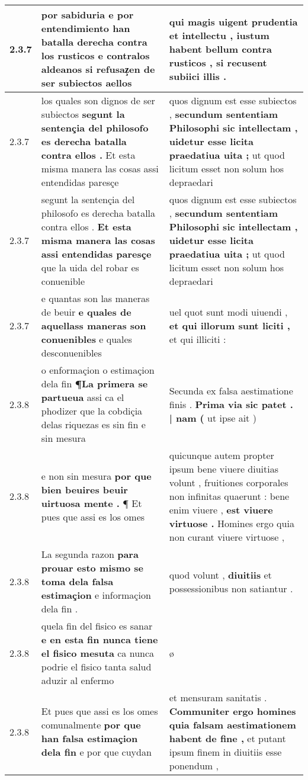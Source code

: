 \begin{tabular}{|p{1cm}|p{6.5cm}|p{6.5cm}|}
2.3.7 & por sabiduria e por entendimiento han batalla derecha contra los rusticos \textbf{ e contralos aldeanos } si refusaz̧en de ser subiectos aellos & qui magis uigent prudentia et intellectu , \textbf{ iustum habent bellum contra rusticos , } si recusent subiici illis . \\\hline
2.3.7 & los quales son dignos de ser subiectos \textbf{ segunt la sentençia del philosofo es derecha batalla contra ellos . } Et esta misma manera las cosas assi entendidas paresçe & quos dignum est esse subiectos , \textbf{ secundum sententiam Philosophi sic intellectam , uidetur esse licita praedatiua uita ; } ut quod licitum esset non solum hos depraedari \\\hline
2.3.7 & segunt la sentençia del philosofo es derecha batalla contra ellos . \textbf{ Et esta misma manera las cosas assi entendidas paresçe } que la uida del robar es conuenible & quos dignum est esse subiectos , \textbf{ secundum sententiam Philosophi sic intellectam , uidetur esse licita praedatiua uita ; } ut quod licitum esset non solum hos depraedari \\\hline
2.3.7 & e quantas son las maneras de beuir \textbf{ e quales de aquellass maneras son conuenibles } e quales desconuenibles & uel quot sunt modi uiuendi , \textbf{ et qui illorum sunt liciti , } et qui illiciti : \\\hline
2.3.8 & o enformaçion o estimaçion dela fin \textbf{ ¶La primera se partueua } assi ca el phodizer que la cobdiçia delas riquezas es sin fin e sin mesura & Secunda ex falsa aestimatione finis . \textbf{ Prima via sic patet . | nam ( } ut ipse ait ) \\\hline
2.3.8 & e non sin mesura \textbf{ por que bien beuires beuir uirtuosa mente . } ¶ Et pues que assi es los omes & quicunque autem propter ipsum bene viuere diuitias volunt , fruitiones corporales non infinitas quaerunt : bene enim viuere , \textbf{ est viuere virtuose . } Homines ergo quia non curant viuere virtuose , \\\hline
2.3.8 & La segunda razon \textbf{ para prouar esto mismo se toma dela falsa estimaçion } e informaçion dela fin . & quod volunt , \textbf{ diuitiis } et possessionibus non satiantur . \\\hline
2.3.8 & quela fin del fisico es sanar \textbf{ e en esta fin nunca tiene el fisico mesuta } ca nunca podrie el fisico tanta salud aduzir al enfermo & ø \\\hline
2.3.8 & Et pues que assi es los omes comunalmente \textbf{ por que han falsa estimaçion dela fin } e por que cuydan & et mensuram sanitatis . \textbf{ Communiter ergo homines quia falsam aestimationem habent de fine , } et putant ipsum finem in diuitiis esse ponendum , \\\hline

\end{tabular}
